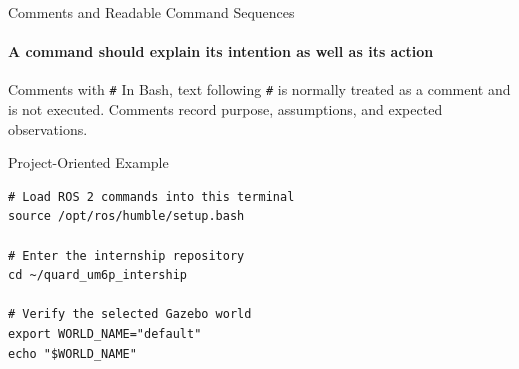 \begin{frame}[fragile]{Comments and Readable Command Sequences}
\framesubtitle{A command should explain its intention as well as its action}

\footnotesize

\begin{block}{Comments with \texttt{\#}}
In Bash, text following \texttt{\#} is normally treated as a comment and is not
executed. Comments record purpose, assumptions, and expected observations.
\end{block}

\begin{exampleblock}{Project-Oriented Example}
\begin{verbatim}
# Load ROS 2 commands into this terminal
source /opt/ros/humble/setup.bash

# Enter the internship repository
cd ~/quard_um6p_intership

# Verify the selected Gazebo world
export WORLD_NAME="default"
echo "$WORLD_NAME"
\end{verbatim}
\end{exampleblock}

\end{frame}

